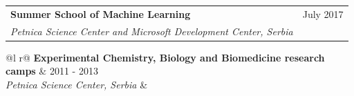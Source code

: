 \documentclass[a4paper,12pt]{article}
\begin{document}
\begin{tabularx}{\linewidth}{ @{}l r@{} }
\textbf{Summer School of Machine Learning} & \hfill \qquad \qquad \qquad \qquad \qquad  \quad July 2017 \\
\textit{Petnica Science Center and Microsoft Development Center, Serbia} & \\[3.75pt]
\end{tabularx}

\begin{tabularx}{\linewidth}{ @{}l r@{} }
\textbf{Experimental Chemistry, Biology and Biomedicine research camps} & \hfill 2011 - 2013 \\
\textit{Petnica Science Center, Serbia} & \\[3.75pt]
\end{tabularx}
\end{document}
